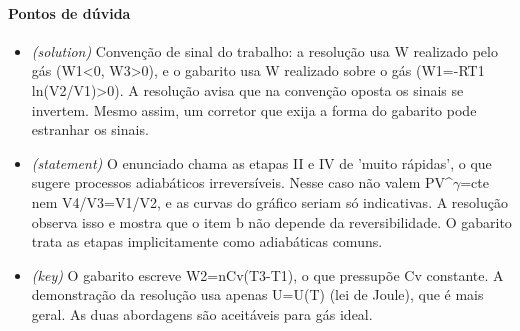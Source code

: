 \documentclass{article}%
\begin{document}
\paragraph{Pontos de dúvida}%
\begin{itemize}%
\item%
\textit{(solution)} Convenção de sinal do trabalho: a resolução usa W realizado pelo gás (W1<0, W3>0), e o gabarito usa W realizado sobre o gás (W1=-RT1 ln(V2/V1)>0). A resolução avisa que na convenção oposta os sinais se invertem. Mesmo assim, um corretor que exija a forma do gabarito pode estranhar os sinais.%
\item%
\textit{(statement)} O enunciado chama as etapas II e IV de 'muito rápidas', o que sugere processos adiabáticos irreversíveis. Nesse caso não valem PV\^{}$\gamma$=cte nem V4/V3=V1/V2, e as curvas do gráfico seriam só indicativas. A resolução observa isso e mostra que o item b não depende da reversibilidade. O gabarito trata as etapas implicitamente como adiabáticas comuns.%
\item%
\textit{(key)} O gabarito escreve W2=nCv(T3-T1), o que pressupõe Cv constante. A demonstração da resolução usa apenas U=U(T) (lei de Joule), que é mais geral. As duas abordagens são aceitáveis para gás ideal.%
\end{itemize}%
\end{document}
